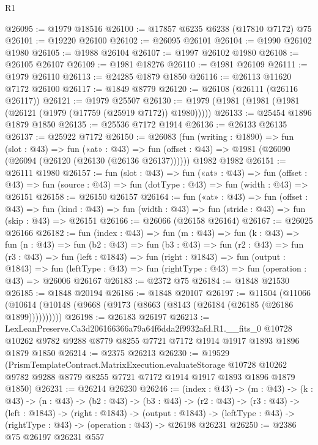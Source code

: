 \begin{lexlean}{R1}
\begin{coremodule}
@26095 := @1979 @18516
@26100 := @17857 @6235 @6238 (@17810 @7172) @75
@26101 := @19220 @26100
@26102 := @26095 @26101
@26104 := @1990 @26102 @1980
@26105 := @1988 @26104
@26107 := @1997 @26102 @1980
@26108 := @26105 @26107
@26109 := @1981 @18276
@26110 := @1981 @26109
@26111 := @1979 @26110
@26113 := @24285 @1879 @1850
@26116 := @26113 @11620 @7172 @26100
@26117 := @1849 @8779
@26120 := @26108 (@26111 (@26116 @26117))
@26121 := @1979 @25507
@26130 := @1979 (@1981 (@1981 (@1981 (@26121 (@1979 (@17759 (@25919 @7172)) @1980)))))
@26133 := @25454 @1896 @1879 @1850
@26135 := @25536 @7172 @1914
@26136 := @26133 @26135
@26137 := @25922 @7172
@26150 := @26083
    (fun (writing : @1890) =>
    fun (slot : @43) =>
    fun («at» : @43) =>
    fun (offset : @43) => @1981 (@26090 (@26094 (@26120 (@26130 (@26136 @26137))))))
    @1982
    @1982
@26151 := @26111 @1980
@26157 := fun (slot : @43) =>
  fun («at» : @43) =>
  fun (offset : @43) => fun (source : @43) => fun (dotType : @43) => fun (width : @43) => @26151
@26158 := @26150 @26157
@26164 := fun («at» : @43) =>
  fun (offset : @43) =>
  fun (kind : @43) => fun (width : @43) => fun (stride : @43) => fun (skip : @43) => @26151
@26166 := @26066 (@26158 @26164)
@26167 := @26025 @26166
@26182 := fun (index : @43) =>
  fun (m : @43) =>
  fun (k : @43) =>
  fun (n : @43) =>
  fun (b2 : @43) =>
  fun (b3 : @43) =>
  fun (r2 : @43) =>
  fun (r3 : @43) =>
  fun (left : @1843) =>
  fun (right : @1843) =>
  fun (output : @1843) =>
  fun (leftType : @43) => fun (rightType : @43) => fun (operation : @43) => @26006 @26167
@26183 := @2372 @75
@26184 := @1848 @21530
@26185 := @1848 @20194
@26186 := @1848 @20107
@26197 := @11504
    (@11066 (@10614 (@10148 (@9668 (@9173 (@8663 (@8143 (@26184 (@26185 (@26186 @1899))))))))))
@26198 := @26183 @26197
@26213 := LexLeanPreserve.Ca3d206166366a79a64f6dda2f9932afd.R1.__fits_0
    @10728
    @10262
    @9782
    @9288
    @8779
    @8255
    @7721
    @7172
    @1914
    @1917
    @1893
    @1896
    @1879
    @1850
@26214 := @2375 @26213
@26230 := @19529
    (PrismTemplateContract.MatrixExecution.evaluateStorage
      @10728
      @10262
      @9782
      @9288
      @8779
      @8255
      @7721
      @7172
      @1914
      @1917
      @1893
      @1896
      @1879
      @1850)
@26231 := @26214 @26230
@26246 := (index : @43) ->
  (m : @43) ->
  (k : @43) ->
  (n : @43) ->
  (b2 : @43) ->
  (b3 : @43) ->
  (r2 : @43) ->
  (r3 : @43) ->
  (left : @1843) ->
  (right : @1843) ->
  (output : @1843) -> (leftType : @43) -> (rightType : @43) -> (operation : @43) -> @26198 @26231
@26250 := @2386 @75 @26197 @26231 @557

\end{coremodule}
\end{lexlean}
